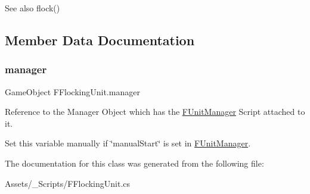 \begin{DoxySeeAlso}{See also}
flock() 
\end{DoxySeeAlso}


\subsection{Member Data Documentation}
\mbox{\label{class_f_flocking_unit_af63c7d39a0269bb66be7f75c7ee830be}} 
\subsubsection{\texorpdfstring{manager}{manager}}
{\footnotesize\ttfamily Game\+Object F\+Flocking\+Unit.\+manager}



Reference to the Manager Object which has the \hyperlink{class_f_unit_manager}{F\+Unit\+Manager} Script attached to it. 

Set this variable manually if \char`\"{}manual\+Start\char`\"{} is set in \hyperlink{class_f_unit_manager}{F\+Unit\+Manager}. 

The documentation for this class was generated from the following file\+:\begin{DoxyCompactItemize}
\item 
Assets/\+\_\+\+Scripts/F\+Flocking\+Unit.\+cs\end{DoxyCompactItemize}
